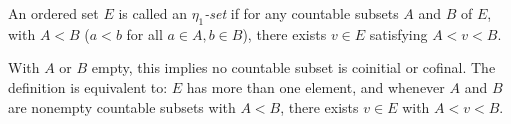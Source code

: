 An ordered set $E$ is called an \emph{$\eta_1$-set} if for any countable subsets $A$ and $B$ of $E$, with $A < B$ ($a < b$ for all $a \in A, b \in B$), there exists $v \in E$ satisfying $A < v < B$.

With $A$ or $B$ empty, this implies no countable subset is coinitial or cofinal. The definition is equivalent to: $E$ has more than one element, and whenever $A$ and $B$ are nonempty countable subsets with $A < B$, there exists $v \in E$ with $A < v < B$.
